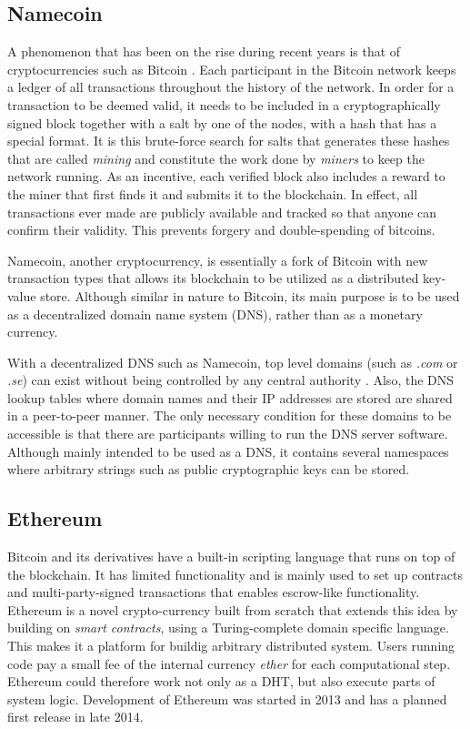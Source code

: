 \subsection{Namecoin}
A phenomenon that has been on the rise during recent years is that of cryptocurrencies such as Bitcoin \cite{CryptoCoinInsider:2014:Online}. Each participant in the Bitcoin network keeps a ledger of all transactions throughout the history of the network. In order for a transaction to be deemed valid, it needs to be included in a cryptographically signed block together with a salt by one of the nodes, with a hash that has a special format. It is this brute-force search for salts that generates these hashes that are called \emph{mining} and constitute the work done by \emph{miners} to keep the network running. As an incentive, each verified block also includes a reward to the miner that first finds it and submits it to the blockchain\cite{internetForBeginners:2014:Online}. In effect, all transactions ever made are publicly available and tracked so that anyone can confirm their validity. This prevents forgery and double-spending of bitcoins.

Namecoin\cite{CryptoCoinInsider:2014:Online}, another cryptocurrency, is essentially a fork of Bitcoin with new transaction types that allows its blockchain to be utilized as a distributed key-value store. Although similar in nature to Bitcoin, its main purpose is to be used as a decentralized domain name system (DNS), rather than as a monetary currency.

With a decentralized DNS such as Namecoin, top level domains (such as \emph{.com} or \emph{.se}) can exist without being controlled by any central authority \cite{CryptoCoinInsider:2014:Online}. Also, the DNS lookup tables where domain names and their IP addresses are stored are shared in a peer-to-peer manner. The only necessary condition for these domains to be accessible is that there are participants willing to run the DNS server software. Although mainly intended to be used as a DNS, it contains several namespaces where arbitrary strings such as public cryptographic keys can be stored.

\subsection{Ethereum}
Bitcoin and its derivatives have a built-in scripting language that runs on top of the blockchain. It has limited functionality and is mainly used to set up contracts and multi-party-signed transactions that enables escrow-like functionality. Ethereum\cite{Ethereum:Online} is a novel crypto-currency built from scratch that extends this idea by building on \emph{smart contracts}, using a Turing-complete domain specific language. This makes it a platform for buildig arbitrary distributed system. Users running code pay a small fee of the internal currency \emph{ether} for each computational step. Ethereum could therefore work not only as a DHT, but also execute parts of system logic. Development of Ethereum was started in 2013 and has a planned first release in late 2014.

